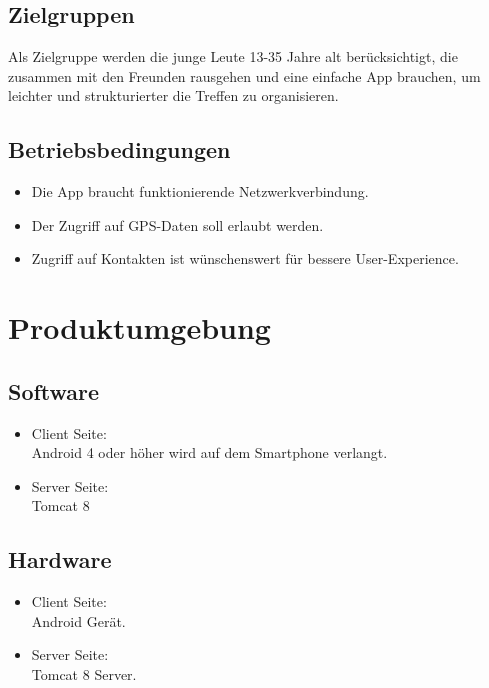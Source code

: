 \documentclass[parskip=full]{scrartcl}
\begin{document}
\subsection{Zielgruppen}
Als Zielgruppe werden die junge Leute 13-35 Jahre alt berücksichtigt, die zusammen mit den Freunden rausgehen und eine einfache App brauchen, um leichter und strukturierter die Treffen zu organisieren.

\subsection{Betriebsbedingungen}
\begin{itemize}
\item Die App braucht funktionierende Netzwerkverbindung.\\
\item Der Zugriff auf GPS-Daten soll erlaubt werden.\\
\item Zugriff auf Kontakten ist wünschenswert für bessere User-Experience.
\end{itemize}
\section{Produktumgebung}

\subsection{Software}
\begin{itemize}
	\item Client Seite:\\
	Android 4 oder höher wird auf dem Smartphone verlangt.
	\item Server Seite:\\
	Tomcat 8 
\end{itemize}


\subsection{Hardware}
\begin{itemize}
\item Client Seite: \\ Android Gerät.\\
\item Server Seite: \\ Tomcat 8 Server.
\end{itemize}
\end{document}
